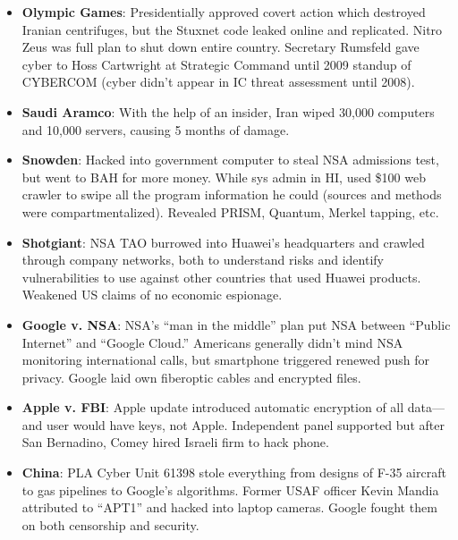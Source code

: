 \documentclass[
]{article}
\begin{document}
\begin{itemize}
\item
  \textbf{Olympic Games}: Presidentially approved covert action which
  destroyed Iranian centrifuges, but the Stuxnet code leaked online and
  replicated. Nitro Zeus was full plan to shut down entire country.
  Secretary Rumsfeld gave cyber to Hoss Cartwright at Strategic Command
  until 2009 standup of CYBERCOM (cyber didn't appear in IC threat
  assessment until 2008).
\item
  \textbf{Saudi Aramco}: With the help of an insider, Iran wiped 30,000
  computers and 10,000 servers, causing 5 months of damage.
\item
  \textbf{Snowden}: Hacked into government computer to steal NSA
  admissions test, but went to BAH for more money. While sys admin in
  HI, used \$100 web crawler to swipe all the program information he
  could (sources and methods were compartmentalized). Revealed PRISM,
  Quantum, Merkel tapping, etc.
\item
  \textbf{Shotgiant}: NSA TAO burrowed into Huawei's headquarters and
  crawled through company networks, both to understand risks and
  identify vulnerabilities to use against other countries that used
  Huawei products. Weakened US claims of no economic espionage.
\item
  \textbf{Google v. NSA}: NSA's ``man in the middle'' plan put NSA
  between ``Public Internet'' and ``Google Cloud.'' Americans generally
  didn't mind NSA monitoring international calls, but smartphone
  triggered renewed push for privacy. Google laid own fiberoptic cables
  and encrypted files.
\item
  \textbf{Apple v. FBI}: Apple update introduced automatic encryption of
  all data---and user would have keys, not Apple. Independent panel
  supported but after San Bernadino, Comey hired Israeli firm to hack
  phone.
\item
  \textbf{China}: PLA Cyber Unit 61398 stole everything from designs of
  F-35 aircraft to gas pipelines to Google's algorithms. Former USAF
  officer Kevin Mandia attributed to ``APT1'' and hacked into laptop
  cameras. Google fought them on both censorship and security.


\end{itemize}
\end{document}
